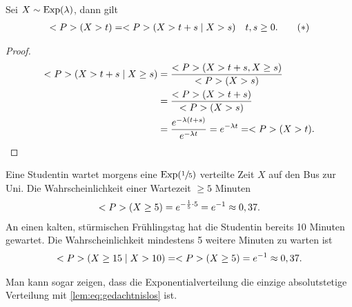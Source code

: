 \begin{lemma}
	Sei $X \sim \EXP(\lambda)$, dann gilt
	\begin{align*}
		\P(X>t) = \P(X > t+s \mid X > s) \quad t,s \ge 0. \tag{$\ast$}\label{lem:eq:gedachtnislos}
	\end{align*}
\end{lemma}
\begin{proof}
	\begin{align*}
		\P(X > t+s \mid X \ge s) &= \frac{\P(X> t+s, X \ge s)}{\P(X > s)}\\
		&= \frac{\P(X > t+s)}{\P(X > s)}\\
		&= \frac{e^{-\lambda(t+s)}}{e^{-\lambda t}} = e^{-\lambda t} = \P(X> t).
	\end{align*}
\end{proof}
\begin{example}
	Eine Studentin wartet morgens eine $\EXP(\sfrac{1}{5})$ verteilte Zeit $X$ auf den Bus zur Uni. Die Wahrscheinlichkeit einer Wartezeit $\ge 5$ Minuten
	\begin{align*}
	\P(X \ge 5) = e^{-\frac{1}{5}\cdot 5} = e^{-1} \approx 0,37.
	\end{align*}
	An einen kalten, stürmischen Frühlingstag hat die Studentin bereits 10 Minuten gewartet. Die Wahrscheinlichkeit mindestens 5 weitere Minuten zu warten ist
	\begin{align*}
	\P(X\ge 15 \mid X > 10) = \P(X\ge 5) = e^{-1} \approx 0,37.
	\end{align*}
\end{example}
\begin{*hint}
	Man kann sogar zeigen, dass die Exponentialverteilung die einzige absolutstetige Verteilung mit \eqref{lem:eq:gedachtnislos} ist.
\end{*hint}
